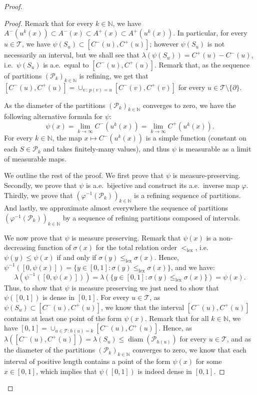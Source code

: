 \documentclass{amsart}
\newcommand{\aE}{a.e.\ }
\newcommand{\ie}{i.e.\ }
\theoremstyle{plain}
\theoremstyle{definition}
\newcommand{\cP}{\mathcal{P}}
\newcommand{\cT}{\mathcal{T}}
\newcommand{\rooot}{\partial} %
\newcommand{\N}{\mathbb{N}}
\DeclareMathOperator{\diam}{diam}
\newcommand{\leqlex}{\leq_{\mathrm{lex}}}
\newcommand{\linflex}{<_{\mathrm{lex}}}
\begin{document}
\begin{proof}
\begin{proof}
Remark that for every $k\in\N$, we have $A^-(u^k(x)) \subset A^-(x) \subset A^+(x) \subset A^+(u^k(x))$.
In particular, for every $u\in\cT$,
	we have $\psi(S_u) \subset [ C^-(u), C^+(u) ]$;
	however $\psi(S_u)$ is not necessarily an interval, 
	but we shall see that $\lambda(\psi(S_u)) = C^+(u) - C^-(u)$,
	\ie $\psi(S_u)$ is \aE equal to $[ C^-(u), C^+(u) ]$.
Remark that, as the sequence of partitions $(\cP_k)_{k\in\N}$ is refining, 
we get that $[C^-(u), C^+(u)] = \cup_{v \, : \, p(v)=u} [C^-(v), C^+(v)]$ for every $u\in\cT\setminus\{\rooot\}$.

As the diameter of the partitions $(\cP_k)_{k\in\N}$ converges to zero,
we have the following alternative formula for $\psi$:
\begin{equation*} 
\psi(x) 
 = \lim_{k \to \infty}   C^-(u^k(x))
 = \lim_{k \to \infty}   C^+(u^k(x)) .
\end{equation*}
For every $k\in\N$,
the map $x\mapsto C^-(u^k(x))$ is a simple function
	(constant on each $S\in\cP_k$ and takes finitely-many values),
and thus $\psi$ is measurable as a limit
	of measurable maps.

\medskip

We outline the rest of the proof.
We first prove that $\psi$ is measure-preserving.
Secondly, we prove that $\psi$ is \aE bijective
	and construct its \aE inverse map $\varphi$.
Thirdly, we prove that $(\varphi^{-1}(\cP_k))_{k\in\N}$ is a refining sequence of partitions.
And lastly, we approximate almost everywhere the sequence
	of partitions $(\varphi^{-1}(\cP_k))_{k\in\N}$
by a sequence of refining partitions composed of intervals.

\medskip

We now prove that $\psi$ is measure preserving.
Remark that $\psi(x)$ is a non-decreasing function of $\sigma(x)$ for 
the total relation order $\linflex$, 
\ie $\psi(y)\leq \psi(x)$ if and only if $\sigma(y) \leqlex \sigma(x)$.
Hence, $\psi^{-1}([0,\psi(x)]) = \{ y\in [0,1] : \sigma(y) \leqlex \sigma(x) \}$, 
and we have:
\[ 
\lambda( \psi^{-1}([0,\psi(x)]) )
= \lambda( \{ y\in [0,1] : \sigma(y) \leqlex \sigma(x) \} )
= \psi(x) . \]
Thus, to show that $\psi$ is measure preserving we just need to show that
$\psi([0,1])$ is dense in $[0,1]$.
For every $u\in\cT$, as $\psi(S_u) \subset [ C^-(u), C^+(u) ]$,
	we know that the interval $[ C^-(u), C^+(u) ]$ contains
	at least one point of the form $\psi(x)$.
Remark that for all $k\in\N$, we have $[0,1] = \cup_{u\in\cT : h(u) = k} [ C^-(u), C^+(u) ]$.
Hence, as $\lambda( [ C^-(u), C^+(u) ] ) = \lambda(S_u) \leq \diam(\cP_{h(u)})$
	for every $u\in\cT$,
	and as the diameter of the partitions $(\cP_k)_{k\in\N}$ converges to zero,
we know that each interval of positive length contains
	a point of the form $\psi(x)$ for some $x\in [0,1]$,
which implies that $\psi([0,1])$ is indeed dense in $[0,1]$.


\end{proof}
\end{proof}
\end{document}
